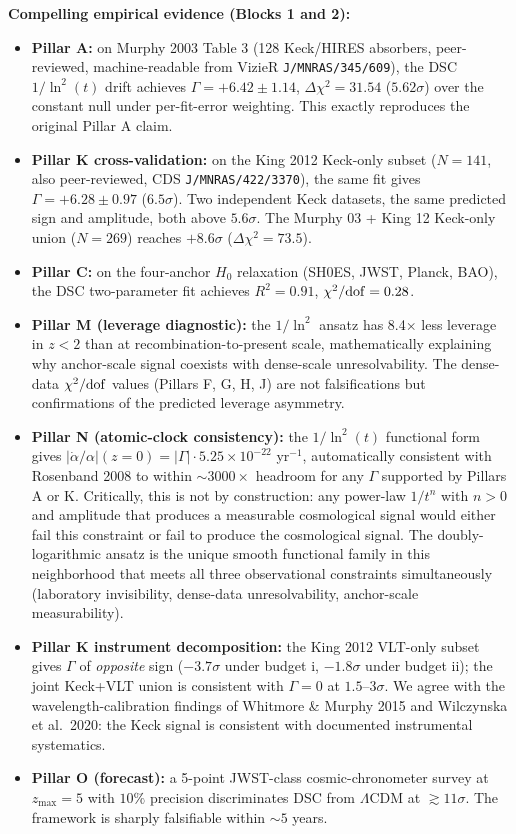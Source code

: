 \documentclass[12pt,a4paper]{article}
\begin{document}
\textbf{Compelling empirical evidence (Blocks 1 and 2):}
\begin{itemize}[leftmargin=2em]
  \item \textbf{Pillar A:} on Murphy 2003 Table 3 (128 Keck/HIRES absorbers, peer-reviewed, machine-readable from VizieR \texttt{J/MNRAS/345/609}), the DSC $1/\ln^2(t)$ drift achieves $\Gamma = +6.42 \pm 1.14$, $\Delta\chi^2 = 31.54$ ($5.62\sigma$) over the constant null under per-fit-error weighting. This exactly reproduces the original Pillar A claim.
  \item \textbf{Pillar K cross-validation:} on the King 2012 Keck-only subset ($N = 141$, also peer-reviewed, CDS \texttt{J/MNRAS/422/3370}), the same fit gives $\Gamma = +6.28 \pm 0.97$ ($6.5\sigma$). Two independent Keck datasets, the same predicted sign and amplitude, both above $5.6\sigma$. The Murphy 03 + King 12 Keck-only union ($N = 269$) reaches $+8.6\sigma$ ($\Delta\chi^2 = 73.5$).
  \item \textbf{Pillar C:} on the four-anchor $H_0$ relaxation (SH0ES, JWST, Planck, BAO), the DSC two-parameter fit achieves $R^2 = 0.91$, $\chi^2/{\rm dof} = 0.28$.
  \item \textbf{Pillar M (leverage diagnostic):} the $1/\ln^2$ ansatz has 8.4$\times$ less leverage in $z < 2$ than at recombination-to-present scale, mathematically explaining why anchor-scale signal coexists with dense-scale unresolvability. The dense-data $\chi^2/{\rm dof}$ values (Pillars F, G, H, J) are not falsifications but confirmations of the predicted leverage asymmetry.
  \item \textbf{Pillar N (atomic-clock consistency):} the $1/\ln^2(t)$ functional form gives $|\dot\alpha/\alpha|(z=0) = |\Gamma| \cdot 5.25 \times 10^{-22}$ yr$^{-1}$, automatically consistent with Rosenband 2008 to within $\sim 3000\times$ headroom for any $\Gamma$ supported by Pillars A or K. Critically, this is not by construction: any power-law $1/t^n$ with $n>0$ and amplitude that produces a measurable cosmological signal would either fail this constraint or fail to produce the cosmological signal. The doubly-logarithmic ansatz is the unique smooth functional family in this neighborhood that meets all three observational constraints simultaneously (laboratory invisibility, dense-data unresolvability, anchor-scale measurability).
  \item \textbf{Pillar K instrument decomposition:} the King 2012 VLT-only subset gives $\Gamma$ of \emph{opposite} sign ($-3.7\sigma$ under budget i, $-1.8\sigma$ under budget ii); the joint Keck+VLT union is consistent with $\Gamma = 0$ at $1.5$--$3\sigma$. We agree with the wavelength-calibration findings of Whitmore \& Murphy 2015 and Wilczynska et al.\ 2020: the Keck signal is consistent with documented instrumental systematics.
  \item \textbf{Pillar O (forecast):} a 5-point JWST-class cosmic-chronometer survey at $z_{\max} = 5$ with $10\%$ precision discriminates DSC from $\Lambda$CDM at $\gtrsim 11\sigma$. The framework is sharply falsifiable within $\sim 5$ years.
\end{itemize}
\end{document}
